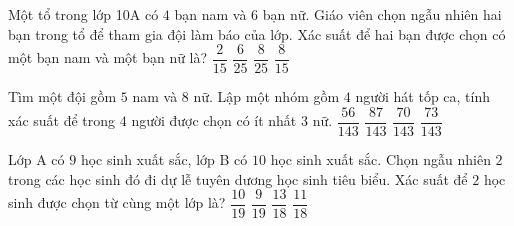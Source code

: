 \begin{ex}%
	Một tổ trong lớp 10A có $4$ bạn nam và $6$ bạn nữ. Giáo viên chọn ngẫu nhiên hai bạn trong tổ để tham gia đội làm báo của  lớp. Xác suất để hai bạn được chọn có một bạn nam và một bạn nữ là?
	\choice 
		 {$\dfrac{2}{15}$}
		{$\dfrac{6}{25}$} 
		{$\dfrac{8}{25}$} 
		 {\True $\dfrac{8}{15}$}
\end{ex}

\begin{ex}%
	Tìm một đội gồm $ 5 $ nam và $ 8 $ nữ. Lập một nhóm  gồm $ 4 $ người hát tốp ca, tính xác suất để trong $ 4 $ người được chọn có ít nhất $ 3 $ nữ.
	 \choice
		 {$\dfrac{56}{143}$}
		{$\dfrac{87}{143}$} 
		 {\True $\dfrac{70}{143}$}
		{$\dfrac{73}{143}$} 
\end{ex}

\begin{ex}%
	Lớp A có $9$ học sinh xuất sắc, lớp B có $10$ học sinh xuất  sắc. Chọn ngẫu nhiên $2$ trong các học sinh
	đó đi dự lễ tuyên dương học sinh tiêu biểu. Xác suất để $2$ học sinh được chọn từ cùng một  lớp là?
	 \choice
		{$\dfrac{10}{19}$} 
		{\True  $\dfrac{9}{19}$}
		{$\dfrac{13}{18}$} 
		 {$\dfrac{11}{18}$}
\end{ex}
